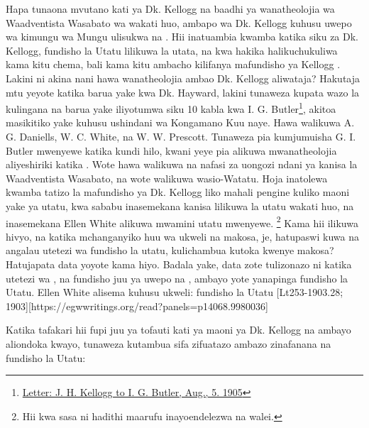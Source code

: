 Hapa tunaona mvutano kati ya Dk. Kellogg na baadhi ya wanatheolojia wa Waadventista Wasabato wa wakati huo, ambapo  wa Dk. Kellogg kuhusu uwepo wa kimungu wa Mungu ulisukwa na . Hii inatuambia kwamba katika siku za Dk. Kellogg, fundisho la Utatu lilikuwa la utata, na kwa hakika halikuchukuliwa kama kitu chema, bali kama kitu ambacho kilifanya mafundisho ya Kellogg . Lakini ni akina nani hawa wanatheolojia ambao Dk. Kellogg aliwataja? Hakutaja mtu yeyote katika barua yake kwa Dk. Hayward, lakini tunaweza kupata wazo la  kulingana na barua yake iliyotumwa siku 10 kabla kwa I. G. Butler\footnote{\href{https://forgotten-pillar.s3.us-east-2.amazonaws.com/1905-08-05-kellogg-butler.pdf}{Letter: J. H. Kellogg to I. G. Butler, Aug., 5. 1905}}, akitoa masikitiko yake kuhusu ushindani wa Kongamano Kuu naye. Hawa walikuwa A. G. Daniells, W. C. White, na W. W. Prescott. Tunaweza pia kumjumuisha G. I. Butler mwenyewe katika kundi hilo, kwani yeye pia alikuwa mwanatheolojia aliyeshiriki katika . Wote hawa walikuwa na nafasi za uongozi ndani ya kanisa la Waadventista Wasabato, na wote walikuwa wasio-Watatu. Hoja inatolewa kwamba tatizo la mafundisho ya Dk. Kellogg liko mahali pengine kuliko maoni yake ya utatu, kwa sababu inasemekana kanisa lilikuwa la utatu wakati huo, na inasemekana Ellen White alikuwa mwamini utatu mwenyewe. \footnote{Hii kwa sasa ni hadithi maarufu inayoendelezwa na walei.} Kama hii ilikuwa hivyo, na katika mchanganyiko huu wa ukweli na makosa, je, hatupaswi kuwa na angalau utetezi wa fundisho la utatu, kulichambua kutoka kwenye makosa? Hatujapata data yoyote kama hiyo. Badala yake, data zote tulizonazo ni katika utetezi wa , na fundisho juu ya uwepo na , ambayo yote yanapinga fundisho la Utatu. Ellen White alisema kuhusu ukweli: fundisho la Utatu [Lt253-1903.28; 1903][https://egwwritings.org/read?panels=p14068.9980036]

Katika tafakari hii fupi juu ya tofauti kati ya maoni ya Dk. Kellogg na  ambayo aliondoka kwayo, tunaweza kutambua sifa zifuatazo ambazo zinafanana na fundisho la Utatu:

